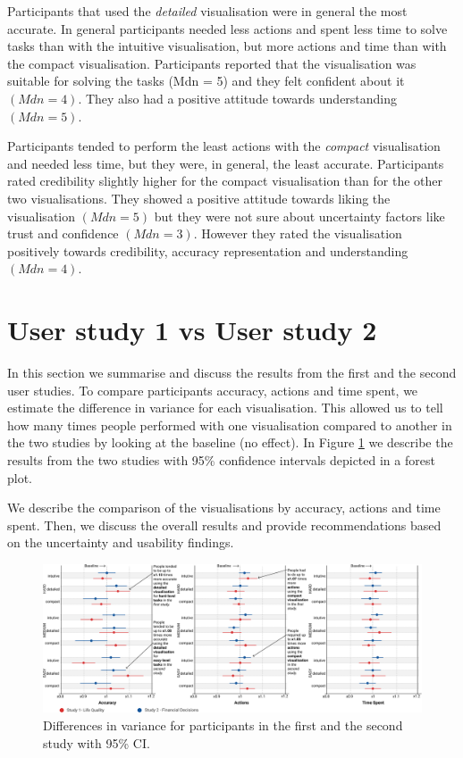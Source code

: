\documentclass[final,5p,times,twocolumn,authoryear]{elsarticle}
\newcommand{\nb}[3]{
		{\colorbox{#2}{\bfseries\sffamily\scriptsize\textcolor{white}{#1}}}
		{\textcolor{#2}{\sf\small$\blacktriangleright$\textit{#3}$\blacktriangleleft$}}}
\newcommand{\kv}[1]{\nb{Katrien}{red}{#1}}
\begin{document}
Participants that used the \emph{detailed} visualisation were in general the most accurate. In general participants needed less actions and spent less time to solve tasks than with the intuitive visualisation, but more actions and time than with the compact visualisation. Participants reported that the visualisation was suitable for solving the tasks (Mdn = 5) and they felt confident about it $(Mdn = 4)$. They also had a positive attitude towards understanding $(Mdn = 5)$.

Participants tended to perform the least actions with the \emph{compact} visualisation and needed less time, but they were, in general, the least accurate. Participants rated credibility slightly higher for the compact visualisation than for the other two visualisations. They showed a positive attitude towards liking the visualisation $(Mdn = 5)$ but they were not sure about uncertainty factors like trust and confidence $(Mdn = 3)$. However they rated the visualisation positively towards credibility, accuracy representation and understanding $(Mdn = 4)$.


\section{User study 1 vs User study 2}

In this section we summarise and discuss the results from the first and the second user studies. To compare participants accuracy, actions and time spent, we estimate the difference in variance for each visualisation. %
This allowed us to tell how many times people performed with one visualisation compared to another in the two studies by looking at the baseline (no effect). In Figure \ref{vizFigures3} we describe the results from the two studies with 95\% confidence intervals depicted in a forest plot.

We describe the comparison of the visualisations by accuracy, actions and time spent. Then, we discuss the overall results and provide recommendations based on the uncertainty and usability findings. 

\begin{figure}[t]
\includegraphics[width=\textwidth]{figures/studyCI_both.png}
\caption{Differences in variance for participants in the first and the second study with 95\% CI.}
\label{vizFigures3}
\end{figure} 
\end{document}
